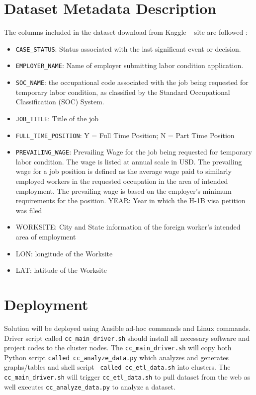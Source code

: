 \documentclass[9pt,twocolumn,twoside]{styles/osajnl}
\begin{document}
\section{Dataset Metadata Description}

The columns included in the dataset download from Kaggle ~\cite{www-kaggle} site  are followed  : 

\begin{itemize}
 \item  \verb|CASE_STATUS|: Status associated with the last significant event or decision.
 \item \verb|EMPLOYER_NAME|: Name of employer submitting labor condition application.
 \item  \verb|SOC_NAME|: the occupational code associated with the job being requested for temporary labor condition, as classified by the Standard Occupational Classification (SOC) System.
 \item  \verb|JOB_TITLE|: Title of the job
 \item  \verb|FULL_TIME_POSITION|: Y = Full Time Position; N = Part Time Position
 \item  \verb|PREVAILING_WAGE|: Prevailing Wage for the job being requested for temporary labor condition. The wage is listed at annual scale in USD. The prevailing wage for a job position is defined as the average wage paid to similarly employed workers in the requested occupation in the area of intended employment. The prevailing wage is based on the employer’s minimum requirements for the position. 
 YEAR: Year in which the H-1B visa petition was filed
 \item  WORKSITE: City and State information of the foreign worker's intended area of employment
 \item  LON: longitude of the Worksite
 \item  LAT: latitude of the Worksite
\end{itemize}

\section{Deployment}
Solution will be deployed using Ansible \cite{wiki-ansible} ad-hoc commands and Linux commands. Driver script called \verb|cc_main_driver.sh|  should install all necessary software and project codes to the cluster nodes.  The \verb|cc_main_driver.sh|  will copy both Python script \verb|called cc_analyze_data.py| which analyzes and generates graphs/tables and shell script \verb| called cc_etl_data.sh| into clusters. The \verb|cc_main_driver.sh|  will trigger \verb|cc_etl_data.sh| to pull dataset from the web as well executes \verb|cc_analyze_data.py| to analyze a dataset. 
\end{document}
